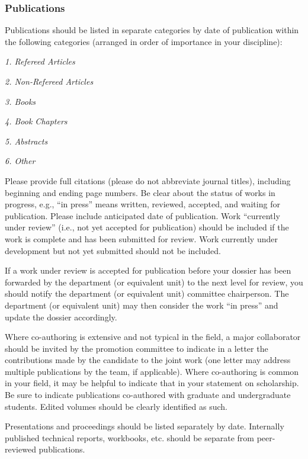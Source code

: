 \subsubsection*{Publications}

Publications should be listed in separate categories by date of publication within the following categories (arranged in order of importance in your discipline):

\textit{1. Refereed Articles}


\textit{2. Non-Refereed Articles}

\textit{3. Books}

\textit{4. Book Chapters}

\textit{5. Abstracts}

\textit{6. Other}


Please provide full citations (please do not abbreviate journal titles), including beginning and ending page numbers. 
Be clear about the status of works in progress, e.g., ``in press'' means written, reviewed, accepted, and waiting for publication. 
Please include anticipated date of publication. 
Work ``currently under review'' (i.e., not yet accepted for publication) should be included if the work is complete and has been submitted for review. 
Work currently under development but not yet submitted should not be included.

If a work under review is accepted for publication before your dossier has been forwarded by the department (or equivalent unit) to the next level for review, you should notify the department (or equivalent unit) committee chairperson. 
The department (or equivalent unit) may then consider the work ``in press'' and update the dossier accordingly.

Where co-authoring is extensive and not typical in the field, a major collaborator should be invited by the promotion committee to indicate in a letter the contributions made by the candidate to the joint work (one letter may address multiple publications by the team, if applicable). 
Where co-authoring is common in your field, it may be helpful to indicate that in your statement on scholarship. 
Be sure to indicate publications co-authored with graduate and undergraduate students. 
Edited volumes should be clearly identified as such.

Presentations and proceedings should be listed separately by date. 
Internally published technical reports, workbooks, etc. should be separate from peer-reviewed publications.

